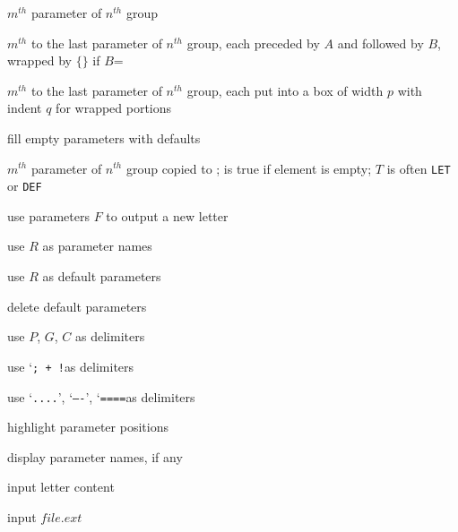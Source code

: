 {\medskip {}
{\eightpoint
\nointerlineskip\parskip=0pt

\hruler
\entry{{\tt\string\paras[$m$][$n$]}}%
  {$m^{th}$ parameter of $n^{th}$ group }%

\entry{{\tt\string\blockparas[$m$][$n$][$A$][$B$]}}%
  {$m^{th}$ to the last parameter of $n^{th}$ group, each
preceded by $A$ and followed by $B$, wrapped by $\{$$\}$ if
$B$={\tt\string\relax}}

\entry{{\tt\string\addressparas[$m$][$n$][$p$][$q$]}}%
  {$m^{th}$ to the last parameter of $n^{th}$ group, each put
into a box of width $p$ with indent $q$ for wrapped portions}


\entry{{\tt\string\loaddefaultparas}}%
  {fill empty parameters with defaults}

\hruler {}
\hruler


%
  {$m^{th}$ parameter of $n^{th}$ group copied to {\tt\string\cachedata};
   {\tt\string\ifemptyparas} is true if element is empty; $T$ is often
   {\tt LET} or {\tt DEF}}%

\hruler


%
  {use parameters $F$ to output a new letter}


%
  {use $R$ as parameter names}

%
  {use $R$ as default parameters}


\entry{{\tt\string\delparadefaults}}%
  {delete default parameters}

\hruler


%
  {use $P$, $G$, $C$ as delimiters}


%
  {use \lq{\tt ; + !}\rqs as delimiters}


\entry{{\tt\string\blockmarks}}%
  {use \lq{\tt ....}\rq, \lq{\tt ----}\rq, \lq{\tt ====}\rqs as delimiters}

\hruler

\entry{{\tt\string\preview}}%
  {highlight parameter positions}

\entry{{\tt\string\showparas}}%
  {display parameter names, if any}

%
  {input letter content}

%
  {input $file.ext$}

}}
